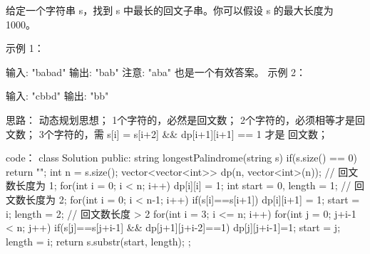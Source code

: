 给定一个字符串 s，找到 s 中最长的回文子串。你可以假设 s 的最大长度为 1000。

示例 1：

输入: "babad"
输出: "bab"
注意: "aba" 也是一个有效答案。
示例 2：

输入: "cbbd"
输出: "bb"





























思路：
动态规划思想；
1个字符的，必然是回文数；
2个字符的，必须相等才是回文数；
3个字符的，需 s[i] = s[i+2] && dp[i+1][i+1] == 1  才是 回文数；



























code：
class Solution {
public:
    string longestPalindrome(string s) {
        if(s.size() == 0) return "";
        int n = s.size();
        vector<vector<int>> dp(n, vector<int>(n));
        // 回文数长度为 1;
        for(int i = 0; i < n; i++) dp[i][i] = 1;
        int start = 0, length = 1;
        // 回文数长度为 2;
        for(int i = 0; i < n-1; i++)
        {
            if(s[i]==s[i+1])
            {
                dp[i][i+1] = 1;
                start = i;
                length = 2;
            }
        }
        // 回文数长度 > 2
        for(int i = 3; i <= n; i++)
        {
            for(int j = 0; j+i-1 < n; j++)
            {
                if(s[j]==s[j+i-1] && dp[j+1][j+i-2]==1)
                {
                    dp[j][j+i-1]=1;
                    start = j;
                    length = i;
                }
            }
        }
        return s.substr(start, length);
    }
};